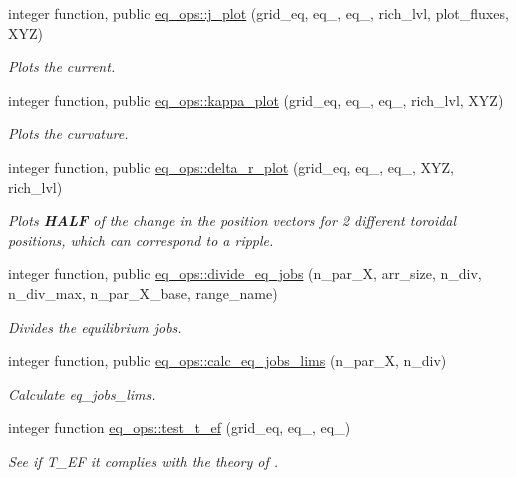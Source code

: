 \begin{DoxyCompactItemize}
integer function, public \hyperlink{namespaceeq__ops_a3064af9c961507ba68e5647b7b1a8d9c}{eq\+\_\+ops\+::j\+\_\+plot} (grid\+\_\+eq, eq\+\_, eq\+\_, rich\+\_\+lvl, plot\+\_\+fluxes, X\+YZ)
\begin{DoxyCompactList}\small\item\em Plots the current. \end{DoxyCompactList}\item 
integer function, public \hyperlink{namespaceeq__ops_a6a073d160b1e0918ea4cde3b439a2277}{eq\+\_\+ops\+::kappa\+\_\+plot} (grid\+\_\+eq, eq\+\_, eq\+\_, rich\+\_\+lvl, X\+YZ)
\begin{DoxyCompactList}\small\item\em Plots the curvature. \end{DoxyCompactList}\item 
integer function, public \hyperlink{namespaceeq__ops_acbdf306f2951fb24a24ca87fe16f5953}{eq\+\_\+ops\+::delta\+\_\+r\+\_\+plot} (grid\+\_\+eq, eq\+\_, eq\+\_, X\+YZ, rich\+\_\+lvl)
\begin{DoxyCompactList}\small\item\em Plots {\bfseries H\+A\+LF} of the change in the position vectors for 2 different toroidal positions, which can correspond to a ripple. \end{DoxyCompactList}\item 
integer function, public \hyperlink{namespaceeq__ops_a576434bcf37c1647c6882429a8fa9243}{eq\+\_\+ops\+::divide\+\_\+eq\+\_\+jobs} (n\+\_\+par\+\_\+X, arr\+\_\+size, n\+\_\+div, n\+\_\+div\+\_\+max, n\+\_\+par\+\_\+\+X\+\_\+base, range\+\_\+name)
\begin{DoxyCompactList}\small\item\em Divides the equilibrium jobs. \end{DoxyCompactList}\item 
integer function, public \hyperlink{namespaceeq__ops_ae23a1703b335e3975a99868660d4c006}{eq\+\_\+ops\+::calc\+\_\+eq\+\_\+jobs\+\_\+lims} (n\+\_\+par\+\_\+X, n\+\_\+div)
\begin{DoxyCompactList}\small\item\em Calculate {\ttfamily eq\+\_\+jobs\+\_\+lims}. \end{DoxyCompactList}\item 
integer function \hyperlink{namespaceeq__ops_a1f5049c3e309fa23ee46fd116c9344f1}{eq\+\_\+ops\+::test\+\_\+t\+\_\+ef} (grid\+\_\+eq, eq\+\_, eq\+\_)
\begin{DoxyCompactList}\small\item\em See if {\ttfamily T\+\_\+\+EF} it complies with the theory of \cite{Weyens3D}. \end{DoxyCompactList}\item 

\end{DoxyCompactItemize}

